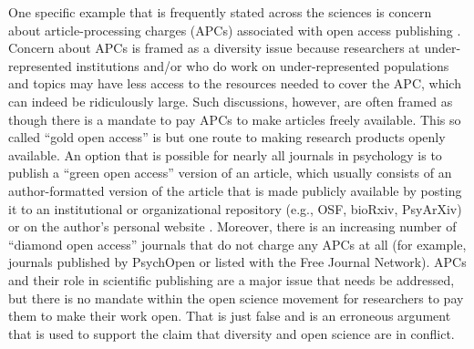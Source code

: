 \documentclass[authordate, empirical]{jote-new-article}
\begin{document}
One specific example that is frequently stated across the sciences is concern about article-processing charges (APCs) associated with open access publishing \parencites[e.g.,][]{Bahlai2019}. Concern about APCs is framed as a diversity issue because researchers at under-represented institutions and/or who do work on under-represented populations and topics may have less access to the resources needed to cover the APC, which can indeed be ridiculously large. Such discussions, however, are often framed as though there is a mandate to pay APCs to make articles freely available. This so called “gold open access” is but one route to making research products openly available. An option that is possible for nearly all journals in psychology is to publish a “green open access” version of an article, which usually consists of an author-formatted version of the article that is made publicly available by posting it to an institutional or organizational repository (e.g., OSF, bioRxiv, PsyArXiv) or on the author's personal website \parencites[see][for details]{Moshontz2021}. Moreover, there is an increasing number of “diamond open access” journals that do not charge any APCs at all (for example, journals published by PsychOpen or listed with the Free Journal Network). APCs and their role in scientific publishing are a major issue that needs be addressed, but there is no mandate within the open science movement for researchers to pay them to make their work open. That is just false and is an erroneous argument that is used to support the claim that diversity and open science are in conflict.
\end{document}
